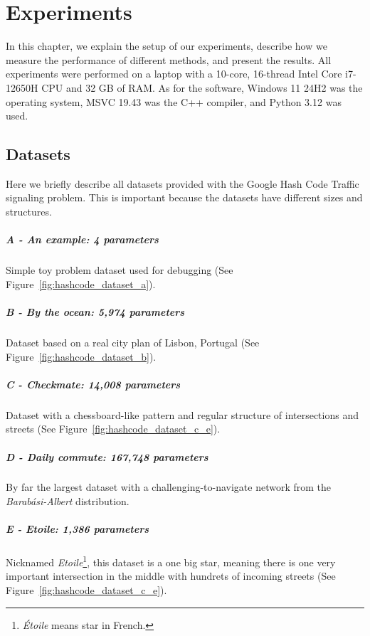 \chapter{Experiments} \label{chap:experiments}

In this chapter, we explain the setup of our experiments, describe how we measure the performance of different methods, and present the results.
All experiments were performed on a laptop with a 10-core, 16-thread Intel Core i7-12650H CPU and 32 GB of RAM. As for the software, Windows 11 24H2 was the operating system, MSVC 19.43 was the C++ compiler, and Python 3.12 was used.

\section{Datasets}

Here we briefly describe all datasets provided with the Google Hash Code Traffic signaling problem. This is important because the datasets have different sizes and structures.

\paragraph{A - An example: 4 parameters} Simple toy problem dataset used for debugging (See Figure~\ref{fig:hashcode_dataset_a}).

\paragraph{B - By the ocean: 5,974 parameters} Dataset based on a real city plan of Lisbon, Portugal (See Figure~\ref{fig:hashcode_dataset_b}).

\paragraph{C - Checkmate: 14,008 parameters} Dataset with a chessboard-like pattern and regular structure of intersections and streets (See Figure~\ref{fig:hashcode_dataset_c_e}).

\paragraph{D - Daily commute: 167,748 parameters} By far the largest dataset with a challenging-to-navigate network from the \textit{Barabási-Albert} distribution.

\paragraph{E - Etoile: 1,386 parameters} Nicknamed \textit{Etoile}\footnote{\textit{Étoile} means star in French.}, this dataset is a one big star, meaning there is one very important intersection in the middle with hundrets of incoming streets (See Figure~\ref{fig:hashcode_dataset_c_e}).

